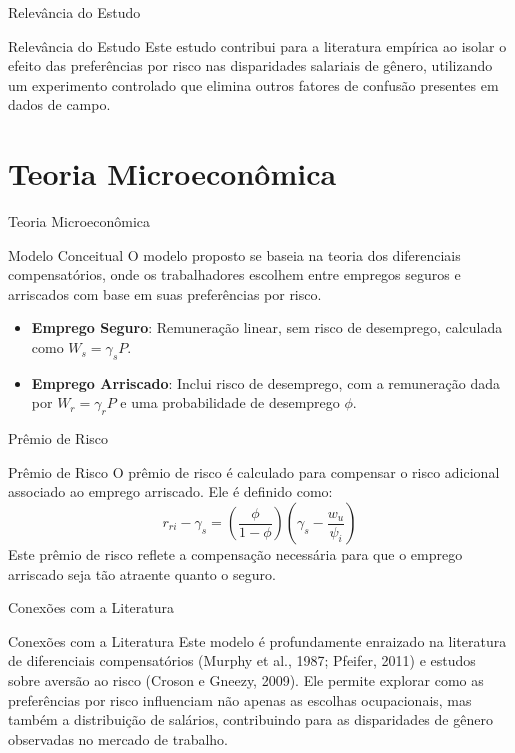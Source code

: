 \documentclass[aspectratio=169, xcolor={dvipsnames}, 10pt, brazil]{beamer}
\begin{document}
\begin{frame}{Relevância do Estudo}
    \begin{block}{Relevância do Estudo}
        Este estudo contribui para a literatura empírica ao isolar o efeito das preferências por risco nas disparidades salariais de gênero, utilizando um experimento controlado que elimina outros fatores de confusão presentes em dados de campo.
    \end{block}
\end{frame}

\section{Teoria Microeconômica}
\begin{frame}{Teoria Microeconômica}
    \begin{block}{Modelo Conceitual}
        O modelo proposto se baseia na teoria dos diferenciais compensatórios, onde os trabalhadores escolhem entre empregos seguros e arriscados com base em suas preferências por risco.
    \end{block}
    
    \vspace{0.5cm}
    
    \begin{itemize}
        \item \textbf{Emprego Seguro}: Remuneração linear, sem risco de desemprego, calculada como $W_s = \gamma_s P$.
        \item \textbf{Emprego Arriscado}: Inclui risco de desemprego, com a remuneração dada por $W_r = \gamma_r P$ e uma probabilidade de desemprego $\phi$.
    \end{itemize}
\end{frame}

\begin{frame}{Prêmio de Risco}
    \begin{block}{Prêmio de Risco}
        O prêmio de risco é calculado para compensar o risco adicional associado ao emprego arriscado. Ele é definido como:
        \[
        r_{ri} - \gamma_s = \left( \frac{\phi}{1-\phi} \right)\left(\gamma_s - \frac{w_u}{\psi_i}\right)
        \]
        Este prêmio de risco reflete a compensação necessária para que o emprego arriscado seja tão atraente quanto o seguro.
    \end{block}
\end{frame}

\begin{frame}{Conexões com a Literatura}
    \begin{block}{Conexões com a Literatura}
        Este modelo é profundamente enraizado na literatura de diferenciais compensatórios (Murphy et al., 1987; Pfeifer, 2011) e estudos sobre aversão ao risco (Croson e Gneezy, 2009). Ele permite explorar como as preferências por risco influenciam não apenas as escolhas ocupacionais, mas também a distribuição de salários, contribuindo para as disparidades de gênero observadas no mercado de trabalho.
    \end{block}
\end{frame}
\end{document}
